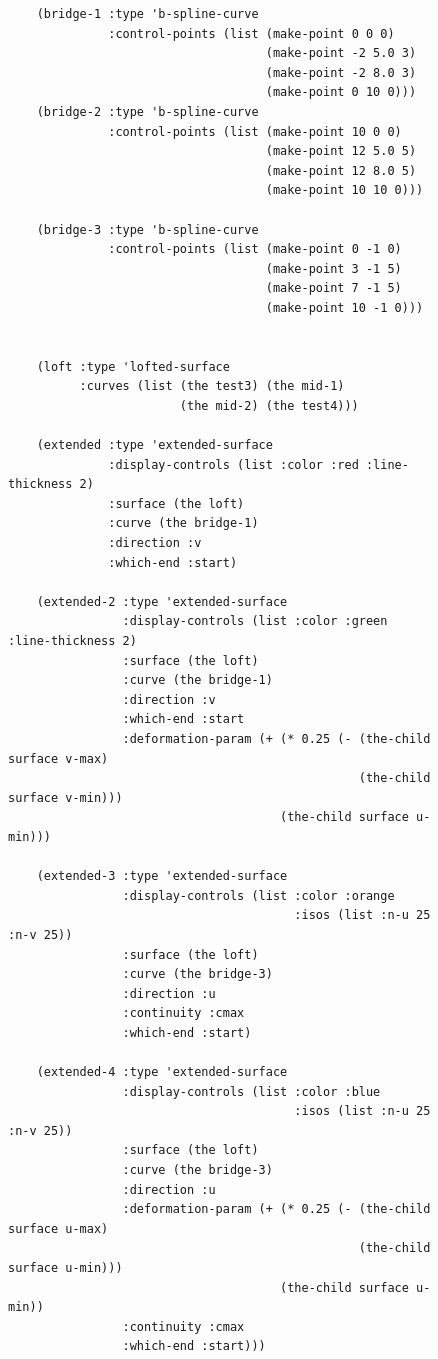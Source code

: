 \documentclass [11pt]{book}
\begin{document}
\begin{itemize}
\begin{figure}
\begin{lrbox}{\boxedverb}
\begin{minipage}{\linewidth}
{\begin{verbatim}
    (bridge-1 :type 'b-spline-curve
              :control-points (list (make-point 0 0 0)
                                    (make-point -2 5.0 3) 
                                    (make-point -2 8.0 3) 
                                    (make-point 0 10 0)))       
    (bridge-2 :type 'b-spline-curve
              :control-points (list (make-point 10 0 0)
                                    (make-point 12 5.0 5) 
                                    (make-point 12 8.0 5) 
                                    (make-point 10 10 0)))      

    (bridge-3 :type 'b-spline-curve
              :control-points (list (make-point 0 -1 0)
                                    (make-point 3 -1 5)
                                    (make-point 7 -1 5)
                                    (make-point 10 -1 0)))

   
    (loft :type 'lofted-surface
          :curves (list (the test3) (the mid-1) 
                        (the mid-2) (the test4)))
   
    (extended :type 'extended-surface
              :display-controls (list :color :red :line-thickness 2)
              :surface (the loft)
              :curve (the bridge-1)
              :direction :v
              :which-end :start)

    (extended-2 :type 'extended-surface
                :display-controls (list :color :green :line-thickness 2)
                :surface (the loft)
                :curve (the bridge-1)
                :direction :v
                :which-end :start
                :deformation-param (+ (* 0.25 (- (the-child surface v-max)
                                                 (the-child surface v-min)))
                                      (the-child surface u-min)))
   
    (extended-3 :type 'extended-surface
                :display-controls (list :color :orange
                                        :isos (list :n-u 25 :n-v 25))
                :surface (the loft)
                :curve (the bridge-3)
                :direction :u
                :continuity :cmax
                :which-end :start)
   
    (extended-4 :type 'extended-surface
                :display-controls (list :color :blue 
                                        :isos (list :n-u 25 :n-v 25))
                :surface (the loft)
                :curve (the bridge-3)
                :direction :u
                :deformation-param (+ (* 0.25 (- (the-child surface u-max)
                                                 (the-child surface u-min)))
                                      (the-child surface u-min))
                :continuity :cmax
                :which-end :start)))              
                  

\end{verbatim}}
\end{minipage}
\end{lrbox}
\end{figure}
\end{itemize}
\end{document}
